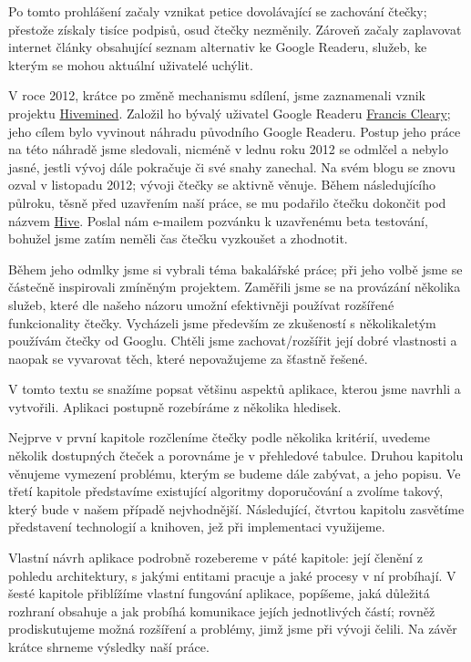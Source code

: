 Po tomto prohlášení začaly vznikat petice dovolávající se zachování čtečky; přestože získaly tisíce podpisů, osud čtečky nezměnily.
Zároveň začaly zaplavovat internet články obsahující seznam alternativ ke Google Readeru, služeb, ke kterým se mohou aktuální uživatelé uchýlit.


V roce 2012, krátce po změně mechanismu sdílení, jsme zaznamenali vznik projektu \href{http://hiveminedblog.tumblr.com/}{Hivemined}.
Založil ho bývalý uživatel Google Readeru \href{mailto:apodysophilia@gmail.com}{Francis Cleary}; jeho cílem bylo vyvinout náhradu původního Google Readeru.
Postup jeho práce na této náhradě jsme sledovali, nicméně v lednu roku 2012 se odmlčel a nebylo jasné, jestli vývoj dále pokračuje či své snahy zanechal.
Na svém blogu se znovu ozval v listopadu 2012; vývoji čtečky se aktivně věnuje.
Během následujícího půlroku, těsně před uzavřením naší práce, se mu podařilo čtečku dokončit pod názvem \href{http://hivereader.com/}{Hive}.
Poslal nám e-mailem pozvánku k uzavřenému beta testování, bohužel jsme zatím neměli čas čtečku vyzkoušet a zhodnotit.

Během jeho odmlky jsme si vybrali téma bakalářské práce; při jeho volbě jsme se částečně inspirovali zmíněným projektem.
Zaměřili jsme se na provázání několika služeb, které dle našeho názoru umožní efektivněji používat rozšířené funkcionality čtečky.
Vycházeli jsme především ze zkušeností s několikaletým používám čtečky od Googlu.
Chtěli jsme zachovat/rozšířit její dobré vlastnosti a naopak se vyvarovat těch, které nepovažujeme za šťastně řešené.


V tomto textu se snažíme popsat většinu aspektů aplikace, kterou jsme navrhli a vytvořili.
Aplikaci postupně rozebíráme z několika hledisek.

Nejprve v první kapitole rozčleníme čtečky podle několika kritérií, uvedeme několik dostupných čteček a porovnáme je v přehledové tabulce.
Druhou kapitolu věnujeme vymezení problému, kterým se budeme dále zabývat, a jeho popisu.
Ve třetí kapitole představíme existující algoritmy doporučování a zvolíme takový, který bude v našem případě nejvhodnější.
Následující, čtvrtou kapitolu zasvětíme představení technologií a knihoven, jež při implementaci využijeme.

Vlastní návrh aplikace podrobně rozebereme v páté kapitole: její členění z pohledu architektury, s jakými entitami pracuje a jaké procesy v ní probíhají.
V šesté kapitole přiblížíme vlastní fungování aplikace, popíšeme, jaká důležitá rozhraní obsahuje a jak probíhá komunikace jejích jednotlivých částí; rovněž prodiskutujeme možná rozšíření a problémy, jimž jsme při vývoji čelili.
Na závěr krátce shrneme výsledky naší práce.
